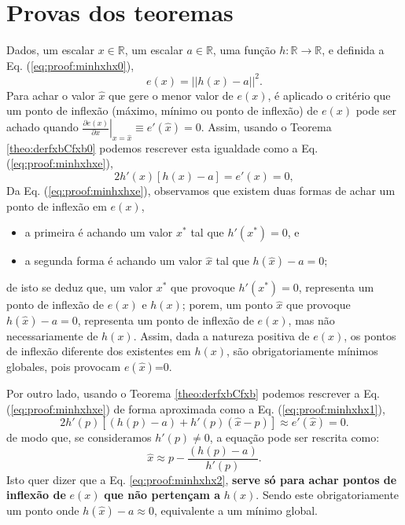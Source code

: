 \section{Provas dos teoremas}
 
\begin{myproofT}\label{proof:theo:minhxhx}
Dados,
um escalar $x \in \mathbb{R}$, 
um escalar $a \in \mathbb{R}$,  
uma função $h:\mathbb{R} \rightarrow \mathbb{R}$, e 
definida a Eq. (\ref{eq:proof:minhxhx0}),
\begin{equation}\label{eq:proof:minhxhx0}
e(x)=||h(x)-a||^2.
\end{equation}
Para achar o valor  $\hat{x}$ que gere o menor valor de $e(x)$, é aplicado
o critério que um ponto de inflexão (máximo, mínimo ou ponto de inflexão) de $e(x)$ pode ser achado quando 
$\left. \frac{\partial e(x)}{\partial x }\right|_{x=\hat{x}} \equiv e'(\hat{x}) =0$.
Assim, 
usando o Teorema \ref{theo:derfxbCfxb0} podemos 
rescrever esta igualdade como a Eq. (\ref{eq:proof:minhxhxe}),
\begin{equation}\label{eq:proof:minhxhxe}
2  h'(x) \left[h(x) -a\right] = e'(x)=0,
\end{equation}
Da Eq. (\ref{eq:proof:minhxhxe}), observamos 
que existem duas formas de achar um ponto de inflexão em $e(x)$,
\begin{itemize}
 \item a primeira é achando um valor $x^{*}$ tal que $h'(x^{*})=0$, e
 \item a segunda forma é achando um valor $\hat{x}$ tal que $h(\hat{x}) -a=0$;
\end{itemize}
de isto se deduz que, um valor $x^{*}$ que provoque $h'(x^{*})=0$, representa um ponto de inflexão de $e(x)$ e $h(x)$;
porem, um ponto $\hat{x}$ que provoque $h(\hat{x})-a=0$, representa um ponto de inflexão de $e(x)$, mas não
necessariamente de $h(x)$. Assim, dada a natureza positiva de $e(x)$, 
os pontos de inflexão diferente dos existentes em $h(x)$,
são obrigatoriamente mínimos globales, pois provocam $e(\hat{x})$=0.

Por outro lado, usando o Teorema \ref{theo:derfxbCfxb} podemos 
rescrever a Eq. (\ref{eq:proof:minhxhxe}) de forma aproximada como a Eq. (\ref{eq:proof:minhxhx1}),
\begin{equation}\label{eq:proof:minhxhx1}
2  h'(p) \left[\left(h(p)-a\right) + h'(p) \left(\hat{x} - p\right)\right] \approx
e'(\hat{x})=0.
\end{equation}
de modo que, se consideramos $h'(p)\neq 0$, a equação pode ser rescrita como:
\begin{equation}\label{eq:proof:minhxhx2}
\hat{x} \approx p - \frac{\left(h(p)-a\right)}{h'(p)}.
\end{equation}
Isto quer dizer que a Eq. \ref{eq:proof:minhxhx2}, \textbf{serve só para
achar pontos de inflexão de} $e(x)$ \textbf{que não pertençam a} $h(x)$.
Sendo este obrigatoriamente um ponto onde $h(\hat{x})-a\approx 0$, 
equivalente a um mínimo global.


\end{myproofT}
